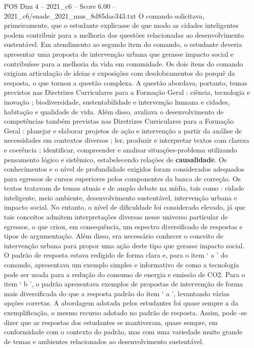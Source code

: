 \begin{textsample}{POS Dim 4 – 2021\_c6 – Score 6.00 – 2021\_c6/enade\_2021\_mus\_8d85dac343.txt}
O comando solicitava, primeiramente, que o estudante explicasse de que modo as cidades inteligentes podem contribuir para a melhoria das questões relacionadas ao desenvolvimento sustentável.
Em atendimento ao segundo item do comando, o estudante deveria apresentar uma proposta de intervenção urbana que gerasse impacto social e contribuísse para a melhoria da vida em comunidade.
Os dois itens do comando exigiam articulação de ideias e exposições com desdobramentos do porquê da resposta, o que tornou a questão complexa.
A questão abordava, portanto, temas previstos nas Diretrizes Curriculares para a Formação Geral : ciência, tecnologia e inovação ; biodiversidade, sustentabilidade e intervenção humana e cidades, habitação e qualidade de vida.
Além disso, avaliava o desenvolvimento de competências também previstas nas Diretrizes Curriculares para a Formação Geral : planejar e elaborar projetos de ação e intervenção a partir da análise de necessidades em contextos diversos ; ler, produzir e interpretar textos com clareza e coerência ; identificar, compreender e analisar situações-problema utilizando pensamento lógico e sistêmico, estabelecendo relações de \textbf{causalidade}.
Os conhecimentos e o nível de profundidade exigidos foram considerados adequados para egressos de cursos superiores pelos componentes da banca de correção.
Os textos tratavam de temas atuais e de amplo debate na mídia, tais como : cidade inteligente, meio ambiente, desenvolvimento sustentável, intervenção urbana e impacto social.
No entanto, o nível de dificuldade foi considerado elevado, já que tais conceitos admitem interpretações diversas nesse universo particular de egressos, o que criou, em consequência, um espectro diversificado de respostas e tipos de argumentação.
Além disso, era necessário conhecer o conceito de intervenção urbana para propor uma ação deste tipo que gerasse impacto social.
O padrão de resposta estava redigido de forma clara e, para o item ‘ a ’ do comando, apresentava um exemplo simples e informativo de como a tecnologia pode ser usada para a redução do consumo de energia e emissão de CO2.
Para o item ‘ b ’, o padrão apresentava exemplos de propostas de intervenção de forma mais diversificada do que a resposta padrão do item ‘ a ’, levantando várias opções corretas.
A abordagem adotada pelos estudantes foi quase sempre a da exemplificação, o mesmo recurso adotado no padrão de resposta.
Assim, pode -se dizer que as respostas dos estudantes se mantiveram, quase sempre, em conformidade com o contexto do padrão, mas com uma variedade muito grande de temas e ambientes relacionados ao desenvolvimento sustentável.

\end{textsample}
